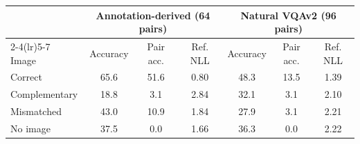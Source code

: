 \begin{tabular}{lcccccc}\toprule & \multicolumn{3}{c}{Annotation-derived (64 pairs)} & \multicolumn{3}{c}{Natural VQAv2 (96 pairs)} \\ \cmidrule(lr){2-4}\cmidrule(lr){5-7} Image & Accuracy & Pair acc. & Ref. NLL & Accuracy & Pair acc. & Ref. NLL \\ \midrule
Correct & 65.6 & 51.6 & 0.80 & 48.3 & 13.5 & 1.39 \\
Complementary & 18.8 & 3.1 & 2.84 & 32.1 & 3.1 & 2.10 \\
Mismatched & 43.0 & 10.9 & 1.84 & 27.9 & 3.1 & 2.21 \\
No image & 37.5 & 0.0 & 1.66 & 36.3 & 0.0 & 2.22 \\
\bottomrule\end{tabular}
